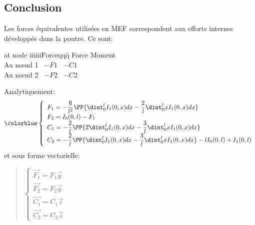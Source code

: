 \medskip
\subsection{Conclusion}

Les forces équivalentes utilisées en MEF correspondent aux efforts internes
développés dans la poutre. Ce sont:
\begin{tabbing}
  at node iiiiii\=Forceqqq\= \kill
       \>Force \>Moment\\
  Au nœud 1 \> ~$-F1$ \> ~$-C1$\\
  Au nœud 2 \> ~$-F2$ \> ~$-C2$\\
\end{tabbing}

Analytiquement:
\begin{equation}\colorblue
\label{Feq}\left\{
\begin{array}{l}
  F_1=-\dfrac 6{l^2}\PP{\dint_0^lI_1(0,x)dx-\dfrac 2l\dint_0^lxI_1(0,x)dx} \\
  F_2=I_0(0,l)-F_1 \\
  C_1=-\dfrac 2l\PP{2\dint_0^lI_1(0,x)dx-\dfrac3l\dint_0^lxI_1(0,x)dx} \\
  C_2=-\dfrac 2l\PP{\dint_0^lI_1(0,x)dx-\dfrac3l\dint_0^lxI_1(0,x)dx}
  -lI_0(0,l)+I_1(0,l)
\end{array}
\right.
\end{equation}
et sous forme vectorielle:
\begin{quotation}
$\left\{
\begin{array}{l}
  \overrightarrow{F_1}=F_1\overrightarrow{y} \\
  \overrightarrow{F_2}=F_2\overrightarrow{y} \\
  \overrightarrow{C_1}=C_1\overrightarrow{z} \\
  \overrightarrow{C_2}=C_2\overrightarrow{z}
\end{array}
\right.~$
\end{quotation}



